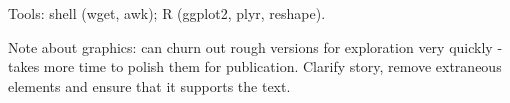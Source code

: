 \documentclass[oneside]{article}
\begin{document}
Tools: shell (wget, awk); R (ggplot2, plyr, reshape).

Note about graphics: can churn out rough versions for exploration very quickly - takes more time to polish them for publication.  Clarify story, remove extraneous elements and ensure that it supports the text.




\end{document}
